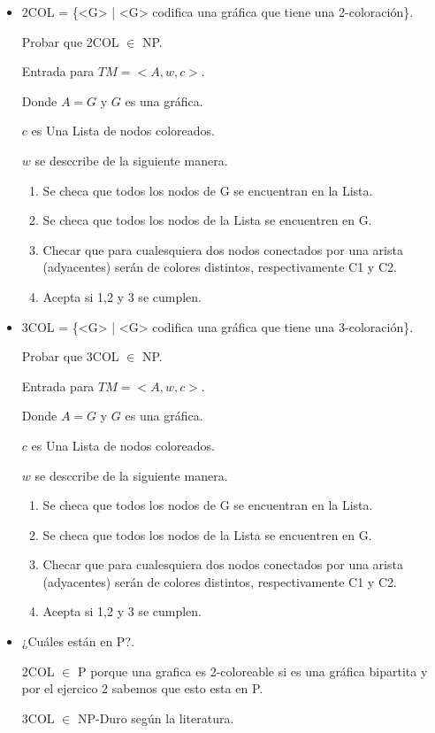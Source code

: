 \documentclass[12pt]{article}
\begin{document}
 \begin{itemize}
  \item 2COL = \{<G> | <G> codifica una gráfica que tiene una 2-coloración\}.
  
  Probar que 2COL $\in$ NP.

  Entrada para $TM = <A,w,c>$.
  
Donde $A = G$ y $G$ es una gráfica.

$c$ es Una Lista de nodos coloreados.

$w$ se desccribe de la siguiente manera.

\begin{enumerate}
 \item Se checa que todos los nodos de G se encuentran en la Lista.
 \item Se checa que todos los nodos de la Lista se encuentren en G.
 \item Checar que para cualesquiera dos nodos conectados por una arista (adyacentes) serán de colores distintos, respectivamente C1 y C2.
 \item Acepta si 1,2 y 3 se cumplen.
\end{enumerate}

  \item 3COL = \{<G> | <G> codifica una gráfica que tiene una 3-coloración\}.
  
  Probar que 3COL $\in$ NP.

  Entrada para $TM = <A,w,c>$.
  
Donde $A = G$ y $G$ es una gráfica.

$c$ es Una Lista de nodos coloreados.

$w$ se desccribe de la siguiente manera.

\begin{enumerate}
 \item Se checa que todos los nodos de G se encuentran en la Lista.
 \item Se checa que todos los nodos de la Lista se encuentren en G.
 \item Checar que para cualesquiera dos nodos conectados por una arista (adyacentes) serán de colores distintos, respectivamente C1 y C2.
 \item Acepta si 1,2 y 3 se cumplen.
\end{enumerate}

  \item  ¿Cuáles están en P?.
  
  2COL $\in$ P porque una grafica es 2-coloreable si es una gráfica bipartita y por el ejercico 2 sabemos que esto esta en P.
  
  3COL $\in$ NP-Duro según la literatura.


 \end{itemize}
\end{document}
